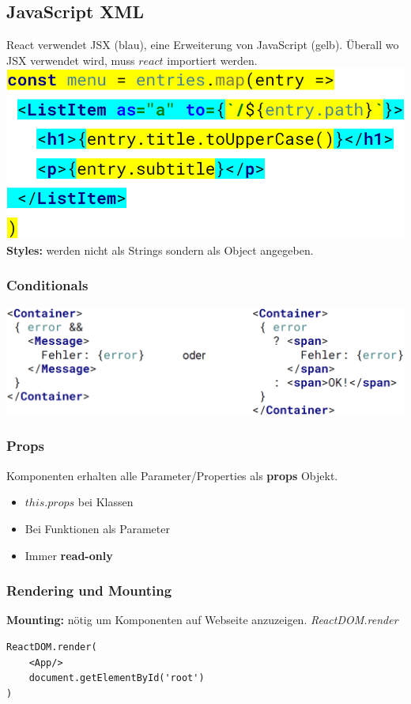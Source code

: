 \subsection{JavaScript XML}
React verwendet JSX (blau), eine Erweiterung von JavaScript (gelb).
Überall wo JSX verwendet wird, muss $react$ importiert werden.\\
\includegraphics[width=0.6\linewidth]{img/react_jsx.png}\\
\textbf{Styles:} werden nicht als Strings sondern als Object angegeben.

\subsubsection{Conditionals}
\includegraphics[width=0.7\linewidth]{img/react_jsx_conditionals.png}

\subsubsection{Props}
Komponenten erhalten alle Parameter/Properties als \textbf{props} Objekt.
\begin{itemize}
    \item $this.props$ bei Klassen
    \item Bei Funktionen als Parameter
    \item Immer \textbf{read-only}
\end{itemize}

\subsubsection{Rendering und Mounting}
\textbf{Mounting:} nötig um Komponenten auf Webseite anzuzeigen. \textit{ReactDOM.render}
\begin{lstlisting}
ReactDOM.render(
    <App/>
    document.getElementById('root')
)
\end{lstlisting}

